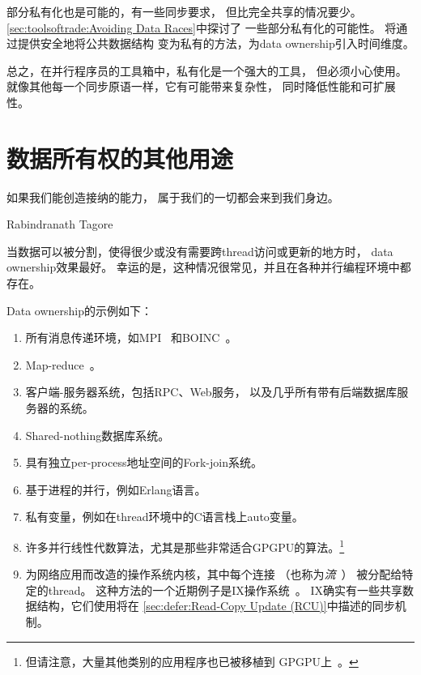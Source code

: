 \QuickQuizEnd

部分私有化也是可能的，有一些同步要求，
但比完全共享的情况要少。
\cref{sec:toolsoftrade:Avoiding Data Races}中探讨了
一些部分私有化的可能性。
将通过提供安全地将公共数据结构
变为私有的方法，为data ownership引入时间维度。

总之，在并行程序员的工具箱中，私有化是一个强大的工具，
但必须小心使用。
就像其他每一个同步原语一样，它有可能带来复杂性，
同时降低性能和可扩展性。

\section{数据所有权的其他用途}
\label{sec:owned:Other Uses of Data Ownership}
%
\epigraph{如果我们能创造接纳的能力，
	  属于我们的一切都会来到我们身边。}
	 {Rabindranath Tagore}

当数据可以被分割，使得很少或没有需要跨thread访问或更新的地方时，
data ownership效果最好。
幸运的是，这种情况很常见，并且在各种并行编程环境中都存在。

Data ownership的示例如下：

\begin{enumerate}
\item	所有消息传递环境，如MPI~\cite{MPIForum2008}
	和BOINC~\cite{BOINC2008}。
\item	Map-reduce~\cite{MapReduce2008MIT}。
\item	客户端-服务器系统，包括RPC、Web服务，
	以及几乎所有带有后端数据库服务器的系统。
\item	Shared-nothing数据库系统。
\item	具有独立per-process地址空间的Fork-join系统。
\item	基于进程的并行，例如Erlang语言。
\item	私有变量，例如在thread环境中的C语言栈上auto变量。
\item	许多并行线性代数算法，尤其是那些非常适合GPGPU的算法。\footnote{
		但请注意，大量其他类别的应用程序也已被移植到
		GPGPU上~\cite{NormMatloff2017ParProcBook,AMD2020ROCm,NVidia2017GPGPU,NVidia2017GPGPU-university}。}
\item	为网络应用而改造的操作系统内核，其中每个连接
	（也称为\emph{流}~\cite{Shenker89,ZhangPhD,McKenney90}）
	被分配给特定的thread。
	这种方法的一个近期例子是IX操作系统~\cite{Belay:2016:IOS:3014162.2997641}。
	IX确实有一些共享数据结构，它们使用将在
	\cref{sec:defer:Read-Copy Update (RCU)}中描述的同步机制。
\end{enumerate}

